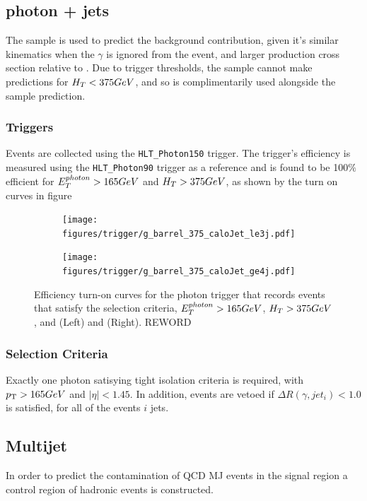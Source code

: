 \subsection{photon + jets}
The \gj sample is used to predict the \zinv background contribution, given it's 
similar kinematics when the $\gamma$ is ignored from the event, and larger 
production cross section relative to \mmj. Due to trigger thresholds, the \gj
sample cannot make predictions for $H_T<375GeV$, and so is complimentarily used
alongside the \mmj sample prediction.

\subsubsection{Triggers}
Events are collected using the \verb!HLT_Photon150! trigger. The trigger's 
efficiency is measured using the \verb!HLT_Photon90! trigger as a reference and
is found to be 100$\%$ efficient for $E_T^{photon}>165GeV$ and $H_T>375GeV$, 
as shown by the turn on curves in figure~

\begin{figure}[ht!]
  \centering
  \begin{subfigure}[b]{0.35\textwidth}
    \texttt{[image: figures/trigger/g\_barrel\_375\_caloJet\_le3j.pdf]}
    \caption{\njlow}
    \label{fig:photon_control_trigeff_le3j}
  \end{subfigure}
  \begin{subfigure}[b]{0.35\textwidth}
    \texttt{[image: figures/trigger/g\_barrel\_375\_caloJet\_ge4j.pdf]}
    \caption{\njhigh}
    \label{fig:photon_control_trigeff_ge4j}
  \end{subfigure}
  \caption{Efficiency turn-on curves for
      the photon trigger that records events that
      satisfy the \gj selection criteria, $E_{T}^{photon} > 165GeV$, $H_T > 375GeV$, and \njlow (Left) and \njhigh
      (Right). REWORD}
  \label{fig:photon_control_trigeff}
\end{figure}

\subsubsection{Selection Criteria}
Exactly one photon satisying tight isolation criteria is required, with 
${p_{\text T}} > 165GeV$ and $|\eta|<1.45$. In addition, events are vetoed if
$\Delta R(\gamma, jet_i)<1.0$ is satisfied, for all of the events $i$ jets.


\subsection{Multijet}
In order to predict the contamination of QCD MJ events in the signal region a 
control region of hadronic events is constructed.


